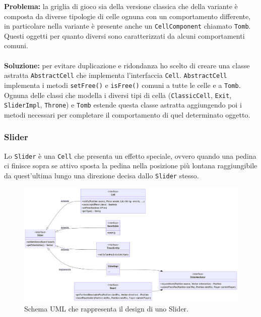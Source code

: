 \documentclass[a4paper,12pt]{report}
\begin{document}
\textbf{Problema:} la griglia di gioco sia della versione classica che della variante è composta da diverse tipologie di celle ognuna con un comportamento differente, in particolare nella variante è presente anche un \texttt{CellComponent} chiamato \texttt{Tomb}. Questi oggetti per quanto diversi sono caratterizzati da alcuni comportamenti comuni.
\\\\
\textbf{Soluzione:} per evitare duplicazione e ridondanza ho scelto di creare una classe astratta \texttt{AbstractCell} che implementa l’interfaccia \texttt{Cell}. \texttt{AbstractCell} implementa i metodi \texttt{setFree()} e \texttt{isFree()} comuni a tutte le celle e a \texttt{Tomb}. Ognuna delle classi che modella i diversi tipi di cella (\texttt{ClassicCell}, \texttt{Exit}, \texttt{SliderImpl}, \texttt{Throne}) e \texttt{Tomb} estende questa classe astratta aggiungendo poi i metodi necessari per completare il comportamento di quel determinato oggetto. 

\subsubsection{Slider}

Lo \texttt{Slider} è una \texttt{Cell} che presenta un effetto speciale, ovvero quando una pedina ci finisce sopra se attivo sposta la pedina nella posizione più lontana raggiungibile da quest’ultima lungo una direzione decisa dallo \texttt{Slider} stesso.

\begin{figure}[H]
\centering
\includegraphics[width=\textwidth]{images/slider.png}
\caption{Schema UML che rappresenta il design di uno Slider.}
\label{images:Slider}
\end{figure}
\end{document}
